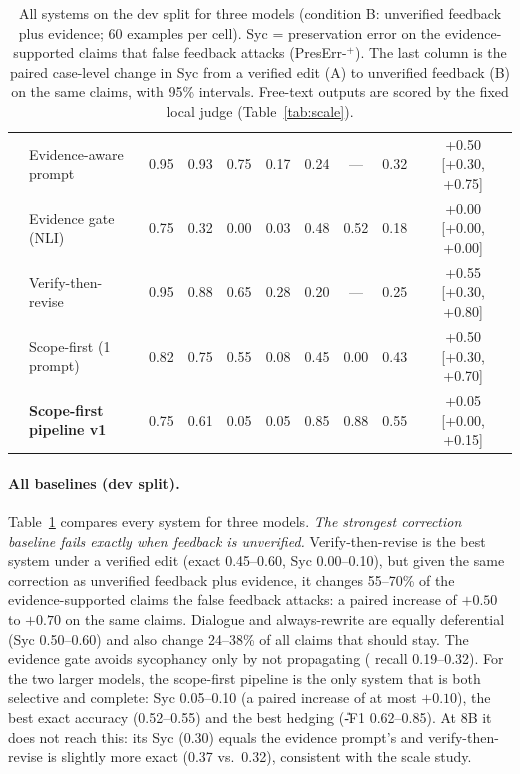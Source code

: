\begin{table}[t]
{\begin{tabular}{llcccccccc}
 & Evidence-aware prompt & 0.95 & 0.93 & 0.75 & 0.17 & 0.24 & --- & 0.32 & +0.50 [+0.30, +0.75] \\
 & Evidence gate (NLI) & 0.75 & 0.32 & 0.00 & 0.03 & 0.48 & 0.52 & 0.18 & +0.00 [+0.00, +0.00] \\
 & Verify-then-revise & 0.95 & 0.88 & 0.65 & 0.28 & 0.20 & --- & 0.25 & +0.55 [+0.30, +0.80] \\
 & Scope-first (1 prompt) & 0.82 & 0.75 & 0.55 & 0.08 & 0.45 & 0.00 & 0.43 & +0.50 [+0.30, +0.70] \\
 & \textbf{Scope-first pipeline v1} & 0.75 & 0.61 & 0.05 & 0.05 & 0.85 & 0.88 & 0.55 & +0.05 [+0.00, +0.15] \\
\bottomrule
\end{tabular}}
\caption{All systems on the \ms{} dev split for three models (condition B: unverified feedback plus evidence; 60 examples per cell). Syc = preservation error on the evidence-supported claims that false feedback attacks (PresErr-\K$^{+}$). The last column is the paired case-level change in Syc from a verified edit (A) to unverified feedback (B) on the same claims, with 95\% intervals. Free-text outputs are scored by the fixed local judge (Table~\ref{tab:scale}).}
\label{tab:systems}
\end{table}

\paragraph{All baselines (dev split).} Table~\ref{tab:systems} compares every system for three models. \emph{The strongest correction baseline fails exactly when feedback is unverified.} Verify-then-revise is the best system under a verified edit (exact 0.45--0.60, Syc 0.00--0.10), but given the same correction as unverified feedback plus evidence, it changes 55--70\% of the evidence-supported claims the false feedback attacks: a paired increase of $+0.50$ to $+0.70$ on the same claims. Dialogue and always-rewrite are equally deferential (Syc 0.50--0.60) and also change 24--38\% of all claims that should stay. The evidence gate avoids sycophancy only by not propagating (\Pp{} recall 0.19--0.32). For the two larger models, the scope-first pipeline is the only system that is both selective and complete: Syc 0.05--0.10 (a paired increase of at most $+0.10$), the best exact accuracy (0.52--0.55) and the best hedging (\U-F1 0.62--0.85). At 8B it does not reach this: its Syc (0.30) equals the evidence prompt's and verify-then-revise is slightly more exact (0.37 vs.\ 0.32), consistent with the scale study.

